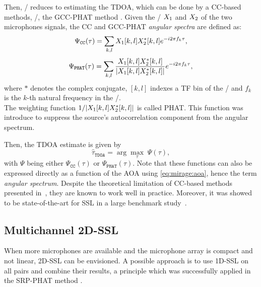 \mynewline
Then, \SSL/ reduces to estimating the \ac{TDOA}, which can be done by a \ac{CC}-based methods, \eg/, the \acf{GCC-PHAT} method .
Given the \STFT/ $X_1$ and $X_2$ of the two microphones signals, the \ac{CC} and \ac{GCC-PHAT} \textit{angular spectra} are defined as:
\begin{equation}\label{eq:mirage:cc}
    \Psi_\mathtt{CC}(\tau) = \sum_{k,l} X_1[k,l] X_2^{*}[k,l] {e}^{-{i} 2  \pi f_k \tau}
    ,
    \end{equation}
\begin{equation}\label{eq:mirage:gccphat}
    \Psi_\mathtt{PHAT}(\tau) = \sum_{k,l}\frac{\MIC_1[k,l] \MIC_2^{*}[k,l]}{\kvbar{ \MIC_1[k,l] \MIC_2^{*}[k,l] }} \cste^{-\csti 2  \pi f_k \tau}
    ,
\end{equation}
where $*$ denotes the complex conjugate, $[k,l]$ indexes a \ac{TF} bin of the \STFT/ and $f_k$ is the $k$-th natural frequency in the \STFT/.
\\The weighting function $1 / \kvbar{ \MIC_1[k,l] \MIC_2^{*}[k,l]}$ is called \acf{PHAT}.
This function was introduce to suppress the source's autocorrelation component from the angular spectrum.

\mynewline
Then, the \ac{TDOA} estimate is given by
\begin{equation*}
    \hat{\tau}_\mathtt{TDOA} = \arg \underset{\tau}{\max} \; \Psi(\tau)
    ,
\end{equation*}
with $\Psi$ being either $\Psi_\mathtt{CC}(\tau)$ or $\Psi_\mathtt{PHAT}(\tau)$.
Note that these functions can also be expressed directly as a function of the \ac{AOA} using \eqref{eq:mirage:aoa}, hence the term \textit{angular spectrum}.
Despite the theoretical limitation of \ac{CC}-based methods presented in~, they are known to work well in practice.
Moreover, it was showed to be state-of-the-art for \ac{SSL} in a large benchmark study~.

\subsection{Multichannel 2D-SSL}\label{subsec:mirage:2D-SSL}
When more microphones are available and the microphone array is compact and not linear, 2D-\ac{SSL} can be envisioned.
A possible approach is to use 1D-\ac{SSL} on all pairs and combine their results, a principle which was successfully applied in the \acf{SRP-PHAT} method .

